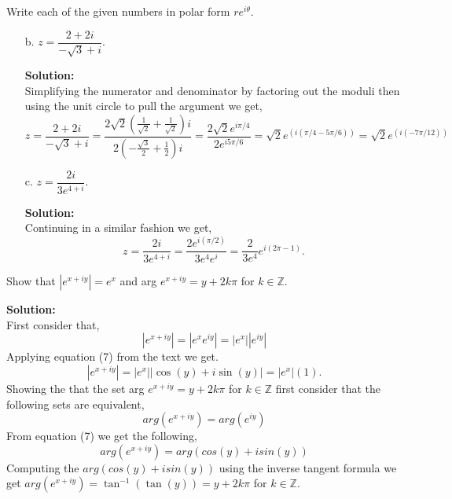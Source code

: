 \documentclass[12pt]{article}
\makeatletter
\theoremstyle{homework}
\newenvironment{exercise}[1]
{\def\@currentlabel{#1}\exercisecore}
{\endexercisecore}
\newcommand{\localhead}[1]{\par\smallskip\noindent\textbf{#1}\nobreak\\}%
\newcommand\solution{\localhead{Solution:}}
\makeatother
\begin{document}
\begin{exercise}{4} Write each of the given numbers in polar form $re^{i\theta}$.\\
    \begin{enumerate}
        \item[b.] $z = \dfrac{2 + 2i}{-\sqrt{3} + i}$.
        \solution  Simplifying the numerator and denominator by factoring out the moduli then using the unit circle to pull the argument we get, 
        \begin{equation*}
            z = \dfrac{2 + 2i}{-\sqrt{3} + i} = \dfrac{2\sqrt{2}(\frac{1}{\sqrt{2}} + \frac{1}{\sqrt{2}})i}{2(-\frac{\sqrt{3}}{2} + \frac{1}{2})i} = \dfrac{2\sqrt{2}e^{i\pi/4}}{2e^{i5\pi/6}} = \sqrt{2}e^{(i(\pi/4 - 5\pi/6))} = \sqrt{2}e^{(i(-7\pi/12))}
        \end{equation*}
        
        
        \item[c.] $z = \dfrac{2i}{3e^{4 + i}}$.\\
        \solution Continuing in a similar fashion we get, 
        \begin{equation*}
            z = \dfrac{2i}{3e^{4 + i}} =\dfrac{2e^{i(\pi/2)}}{3e^{4}e^i} = \dfrac{2}{3e^4} e^{i(2\pi-1)}.  
        \end{equation*}
    \end{enumerate}
    
\end{exercise}
\vspace{.5in}




\begin{exercise}{5} Show that $|e^{x + iy}| = e^x$ and arg $e^{x + iy} = y + 2k\pi$ for $k \in \mathbb{Z}$.\\
    \solution First consider that, 
    \begin{equation*}
        |e^{x + iy}| = |e^{x}e^{iy}| = |e^{x}||e^{iy}| 
    \end{equation*}
    Applying equation (7) from the text we get. 
    \begin{equation*}
        |e^{x + iy}| = |e^{x}||\cos(y) + i\sin(y)| = |e^{x}|(1). 
    \end{equation*} 
    Showing the that the set arg  $e^{x + iy} = y + 2k\pi$ for $k \in \mathbb{Z}$ first consider that the following sets are equivalent, 
    \begin{equation*}
        arg (e^{x + iy}) = arg (e^{iy}) 
    \end{equation*}
    From equation (7) we get the following, 
    \begin{equation*}
        arg (e^{x + iy}) = arg (cos(y) + i sin(y)) 
    \end{equation*}
    Computing the $arg (cos(y) + i sin(y))$ using the inverse tangent formula we get $arg (e^{x + iy}) = \tan^{-1}(\tan(y)) =  y + 2k\pi$ for $k \in \mathbb{Z}$. 
    
\end{exercise}
\vspace{.5in}
\end{document}
